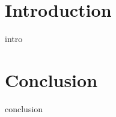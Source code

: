 
\chapter{Introduction}

	intro
	
	
	\cite{serre2005theory}
	
	\cite{serre2007robust}
	

\chapter{Conclusion}

	conclusion